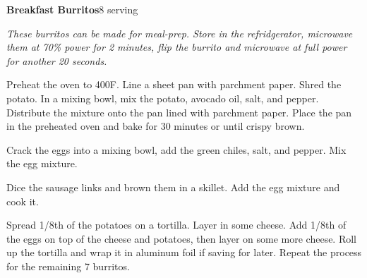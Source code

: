 \documentclass[../recipe-collections/cooking.tex]{subfiles}
\begin{document}
\begin{recipe}{\textbf{Breakfast Burritos}}{8 serving}{}

  \freeform{}\textit{These burritos can be made for meal-prep. Store in the refridgerator,
  microwave them at 70\% power for 2 minutes, flip the burrito and microwave at full power
  for another 20 seconds.}


  Preheat the oven to 400F. Line a sheet pan with parchment paper. 
  Shred the potato. In a mixing bowl, mix the potato, avocado oil, salt, and
  pepper. Distribute the mixture onto the pan lined with parchment paper. Place 
  the pan in the preheated oven and bake for 30 minutes or until crispy brown.


  Crack the eggs into a mixing bowl, add the green chiles, salt, and pepper. Mix 
  the egg mixture.


  Dice the sausage links and brown them in a skillet. Add the egg mixture and cook
  it. 
  

  Spread 1/8th of the potatoes on a tortilla. Layer in some cheese. Add 1/8th of 
  the eggs on top of the cheese and potatoes, then layer on some more cheese. 
  Roll up the tortilla and wrap it in aluminum foil if saving for later. Repeat
  the process for the remaining 7 burritos.


\end{recipe}
\end{document}
